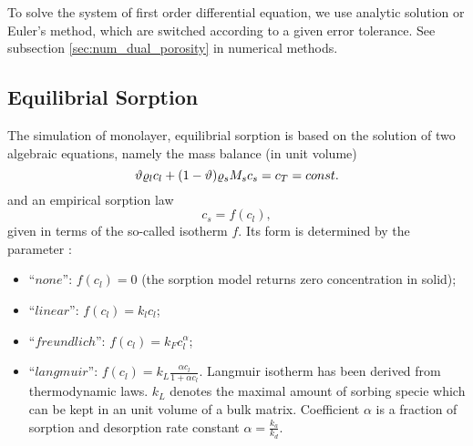 To solve the system of first order differential equation, we use analytic solution or Euler's method,
which are switched according to a given error tolerance. See subsection \ref{sec:num_dual_porosity} 
in numerical methods.
 

\subsection{Equilibrial Sorption}
\label{sec:sorp_math}

The simulation of monolayer, equilibrial sorption is based on the solution of two algebraic equations, namely the mass balance (in unit volume)
\begin{equation}
\label{eq:mass_balance_sorption}
\th \varrho_l c_l + (1-\th) \varrho_s M_s c_s = c_T = const.
\end{equation}
and an empirical sorption law
\begin{equation}
\label{eq:relation_cs_cl}
c_s = f(c_l),
\end{equation}
given in terms of the so-called isotherm $f$.
Its form is determined by the parameter :
\begin{itemize}
 \item ``$none$'': $f(c_l)=0$ (the sorption model returns zero concentration in solid);
 \item ``$linear$'': $f(c_l) = k_l c_l$;
 \item ``$freundlich$'': $f(c_l) = k_F c_l^{\alpha}$;
 \item ``$langmuir$'': $f(c_l) = k_L \frac{\alpha c_l}{1 + \alpha c_l}$.
       Langmuir isotherm has been derived from thermodynamic laws. $k_L$ denotes the maximal amount 
       of sorbing specie which can be kept in an unit volume of a bulk matrix. Coefficient $\alpha$ is 
       a fraction of sorption and desorption rate constant $\alpha = \frac{k_a}{k_d}$.
\end{itemize}

